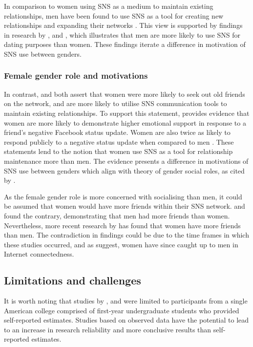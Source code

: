In comparison to women using SNS as a medium to maintain existing relationships, men have been found to use SNS as a tool for creating new relationships and expanding their networks \citep{Mazman2011}. This view is supported by findings in research by \citet{Muscanell2012}, \citet{Raacke2008} and \citet{Haferkamp2012}, which illustrates that men are more likely to use SNS for dating purposes than women. These findings iterate a difference in motivation of SNS use between genders. 

\subsubsection{Female gender role and motivations}

In contrast, \citet{Mazman2011} and \citet{Muscanell2012} both assert that women were more likely to seek out old friends on the network, and are more likely to utilise SNS communication tools to maintain existing relationships. To support this statement, \citet{Joiner2014} provides evidence that women are more likely to demonstrate higher emotional support in response to a friend's negative Facebook status update. Women are also twice as likely to respond publicly to a negative status update when compared to men \citep[p. 167]{Joiner2014}. These statements lend to the notion that women use SNS as a tool for relationship maintenance more than men. The evidence presents a difference in motivations of SNS use between genders which align with  theory of gender social roles, as cited by \citet{Kimbrough2013}.

As the female gender role is more concerned with socialising than men, it could be assumed that women would have more friends within their SNS network. \citet{Raacke2008} and \citet{Fogel2009} found the contrary, demonstrating that men had more friends than women. Nevertheless, more recent research by \citet{McAndrew2012} has found that women have more friends than men. The contradiction in findings could be due to the time frames in which these studies occurred, and as \citet{Fallows2005} suggest, women have since caught up to men in Internet connectedness.

\subsection{Limitations and challenges}

It is worth noting that studies by \citet{Raacke2008}, \citet{Muscanell2012} and \citet{Joiner2014} were limited to participants from a single American college comprised of first-year undergraduate students who provided self-reported estimates. Studies based on observed data have the potential to lead to an increase in research reliability and more conclusive results than self-reported estimates.

